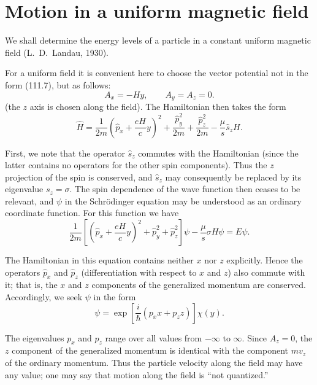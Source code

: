 \section{Motion in a uniform magnetic field}

We shall determine the energy levels of a particle in a constant uniform magnetic field (L.~D.~Landau, 1930).

For a uniform field it is convenient here to choose the vector potential not in the form (111.7), but as follows:
\begin{equation}
 A_x=-Hy,\qquad A_y=A_z=0.
 \tag{112.1}
\end{equation}
(the $z$ axis is chosen along the field). The Hamiltonian then takes the form
\begin{equation}
 \hat H=\frac1{2m}\left(\hat p_x+\frac{eH}{c}y\right)^2+\frac{\hat p_y^2}{2m}+\frac{\hat p_z^2}{2m}-\frac\mu s\hat s_zH.
 \tag{112.2}
\end{equation}

First, we note that the operator $\hat s_z$ commutes with the Hamiltonian (since the latter contains no operators for the other spin components). Thus the $z$ projection of the spin is conserved, and $\hat s_z$ may consequently be replaced by its eigenvalue $s_z=\sigma$. The spin dependence of the wave function then ceases to be relevant, and $\psi$ in the Schrödinger equation may be understood as an ordinary coordinate function. For this function we have
\begin{equation}
 \frac1{2m}\left[\left(\hat p_x+\frac{eH}{c}y\right)^2+\hat p_y^2+\hat p_z^2\right]\psi-\frac\mu s\sigma H\psi=E\psi.
 \tag{112.3}
\end{equation}

The Hamiltonian in this equation contains neither $x$ nor $z$ explicitly. Hence the operators $\hat p_x$ and $\hat p_z$ (differentiation with respect to $x$ and $z$) also commute with it; that is, the $x$ and $z$ components of the generalized momentum are conserved. Accordingly, we seek $\psi$ in the form
\begin{equation}
 \psi=\exp\left[\frac i\hbar(p_xx+p_zz)\right]\chi(y).
 \tag{112.4}
\end{equation}

The eigenvalues $p_x$ and $p_z$ range over all values from $-\infty$ to $\infty$. Since $A_z=0$, the $z$ component of the generalized momentum is identical with the component $mv_z$ of the ordinary momentum. Thus the particle velocity along the field may have any value; one may say that motion along the field is ``not quantized.''

